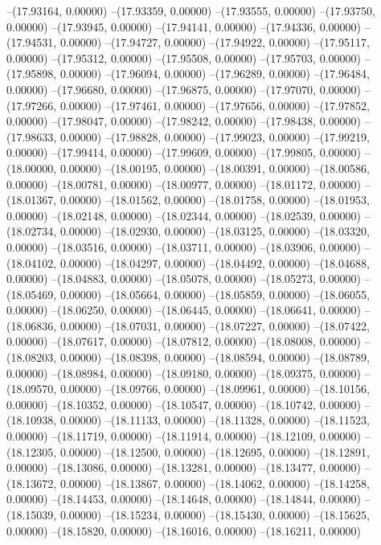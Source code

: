 --(17.93164, 0.00000)
--(17.93359, 0.00000)
--(17.93555, 0.00000)
--(17.93750, 0.00000)
--(17.93945, 0.00000)
--(17.94141, 0.00000)
--(17.94336, 0.00000)
--(17.94531, 0.00000)
--(17.94727, 0.00000)
--(17.94922, 0.00000)
--(17.95117, 0.00000)
--(17.95312, 0.00000)
--(17.95508, 0.00000)
--(17.95703, 0.00000)
--(17.95898, 0.00000)
--(17.96094, 0.00000)
--(17.96289, 0.00000)
--(17.96484, 0.00000)
--(17.96680, 0.00000)
--(17.96875, 0.00000)
--(17.97070, 0.00000)
--(17.97266, 0.00000)
--(17.97461, 0.00000)
--(17.97656, 0.00000)
--(17.97852, 0.00000)
--(17.98047, 0.00000)
--(17.98242, 0.00000)
--(17.98438, 0.00000)
--(17.98633, 0.00000)
--(17.98828, 0.00000)
--(17.99023, 0.00000)
--(17.99219, 0.00000)
--(17.99414, 0.00000)
--(17.99609, 0.00000)
--(17.99805, 0.00000)
--(18.00000, 0.00000)
--(18.00195, 0.00000)
--(18.00391, 0.00000)
--(18.00586, 0.00000)
--(18.00781, 0.00000)
--(18.00977, 0.00000)
--(18.01172, 0.00000)
--(18.01367, 0.00000)
--(18.01562, 0.00000)
--(18.01758, 0.00000)
--(18.01953, 0.00000)
--(18.02148, 0.00000)
--(18.02344, 0.00000)
--(18.02539, 0.00000)
--(18.02734, 0.00000)
--(18.02930, 0.00000)
--(18.03125, 0.00000)
--(18.03320, 0.00000)
--(18.03516, 0.00000)
--(18.03711, 0.00000)
--(18.03906, 0.00000)
--(18.04102, 0.00000)
--(18.04297, 0.00000)
--(18.04492, 0.00000)
--(18.04688, 0.00000)
--(18.04883, 0.00000)
--(18.05078, 0.00000)
--(18.05273, 0.00000)
--(18.05469, 0.00000)
--(18.05664, 0.00000)
--(18.05859, 0.00000)
--(18.06055, 0.00000)
--(18.06250, 0.00000)
--(18.06445, 0.00000)
--(18.06641, 0.00000)
--(18.06836, 0.00000)
--(18.07031, 0.00000)
--(18.07227, 0.00000)
--(18.07422, 0.00000)
--(18.07617, 0.00000)
--(18.07812, 0.00000)
--(18.08008, 0.00000)
--(18.08203, 0.00000)
--(18.08398, 0.00000)
--(18.08594, 0.00000)
--(18.08789, 0.00000)
--(18.08984, 0.00000)
--(18.09180, 0.00000)
--(18.09375, 0.00000)
--(18.09570, 0.00000)
--(18.09766, 0.00000)
--(18.09961, 0.00000)
--(18.10156, 0.00000)
--(18.10352, 0.00000)
--(18.10547, 0.00000)
--(18.10742, 0.00000)
--(18.10938, 0.00000)
--(18.11133, 0.00000)
--(18.11328, 0.00000)
--(18.11523, 0.00000)
--(18.11719, 0.00000)
--(18.11914, 0.00000)
--(18.12109, 0.00000)
--(18.12305, 0.00000)
--(18.12500, 0.00000)
--(18.12695, 0.00000)
--(18.12891, 0.00000)
--(18.13086, 0.00000)
--(18.13281, 0.00000)
--(18.13477, 0.00000)
--(18.13672, 0.00000)
--(18.13867, 0.00000)
--(18.14062, 0.00000)
--(18.14258, 0.00000)
--(18.14453, 0.00000)
--(18.14648, 0.00000)
--(18.14844, 0.00000)
--(18.15039, 0.00000)
--(18.15234, 0.00000)
--(18.15430, 0.00000)
--(18.15625, 0.00000)
--(18.15820, 0.00000)
--(18.16016, 0.00000)
--(18.16211, 0.00000)
